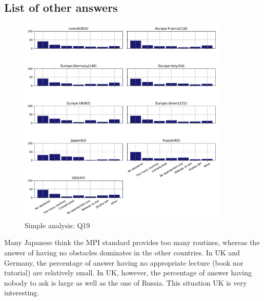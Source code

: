 \subsection{List of other answers}
\begin{itemize}

\end{itemize}

\begin{figure}[htb]
\begin{center}
\includegraphics[width=10cm]{../pdfs/Q19.pdf}
\caption{Simple analysis: Q19}
\label{fig:Q19}
\end{center}
\end{figure}

Many Japanese think the MPI standard provides too many routines, whereas the
answer of having no obstacles dominates in the other countries. In UK and
Germany, the percentage of answer having no appropriate lecture (book nor
tutorial) are relatively small. In UK, however, the percentage of answer having
nobody to ask is large as well as the one of Russia. This situation UK is very
interesting.
